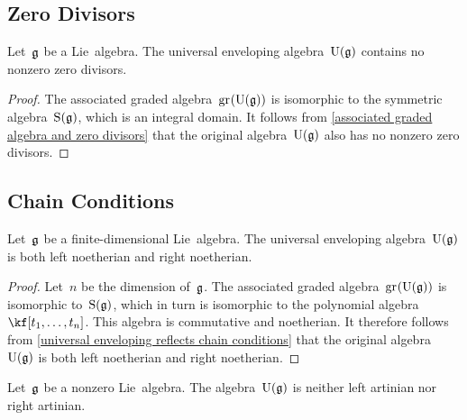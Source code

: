 \subsection*{Zero Divisors}

\begin{proposition}
  \label{uea contains no zero divisors}
  Let~$\mathfrak{g}$ be a Lie~algebra.
  The universal enveloping algebra~$\operatorname{U}(\mathfrak{g})$ contains no nonzero zero divisors.
\end{proposition}


\begin{proof}
  The associated graded algebra~$\gr(\Univ(\glie))$ is isomorphic to the symmetric algebra~$\operatorname{S}(\mathfrak{g})$, which is an integral domain.
  It follows from \cref{associated graded algebra and zero divisors} that the original algebra~$\operatorname{U}(\mathfrak{g})$ also has no nonzero zero divisors.
\end{proof}



\subsection*{Chain Conditions}

\begin{proposition}
  Let~$\mathfrak{g}$ be a finite-dimensional Lie~algebra.
  The universal enveloping algebra~$\operatorname{U}(\mathfrak{g})$ is both left noetherian and right noetherian.
\end{proposition}


\begin{proof}
  Let~$n$ be the dimension of~$\mathfrak{g}$.
  The associated graded algebra~$\gr(\Univ(\glie))$ is isomorphic to~$\operatorname{S}(\mathfrak{g})$, which in turn is isomorphic to the polynomial algebra~$\kf[t_1, \dotsc, t_n]$.
  This algebra is commutative and noetherian.
  It therefore follows from \cref{universal enveloping reflects chain conditions} that the original algebra~$\operatorname{U}(\mathfrak{g})$ is both left noetherian and right noetherian.
\end{proof}


\begin{proposition}
  Let~$\mathfrak{g}$ be a nonzero Lie~algebra.
  The algebra~$\operatorname{U}(\mathfrak{g})$ is neither left artinian nor right artinian.
\end{proposition}


